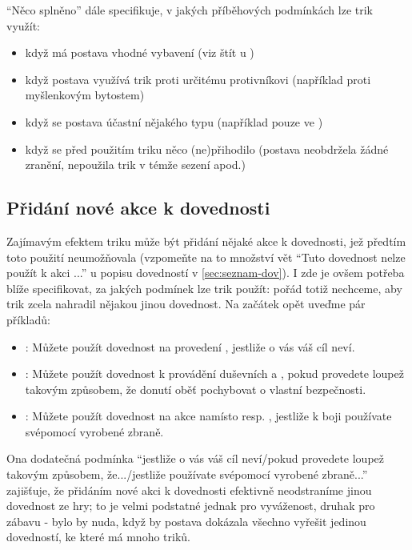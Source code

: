 \documentclass[../main.tex]{subfiles}
\begin{document}
``Něco splněno'' dále specifikuje, v jakých příběhových podmínkách lze trik využít:

\begin{itemize}
\item když má postava vhodné vybavení (viz štít u )
\item když postava využívá trik proti určitému protivníkovi (například proti myšlenkovým bytostem)
\item když se postava účastní nějakého typu  (například pouze ve )
\item když se před použitím triku něco (ne)přihodilo (postava neobdržela žádné zranění, nepoužila trik v témže sezení apod.)
\end{itemize}

\subsection{Přidání nové akce k dovednosti}
\label{sec:trik-pridani}

Zajímavým efektem triku může být přidání nějaké akce k dovednosti, jež předtím toto použití neumožňovala (vzpomeňte na to množství vět ``Tuto dovednost nelze použít k akci ...'' u popisu dovedností v \ref{sec:seznam-dov}). I zde je ovšem potřeba blíže specifikovat, za jakých podmínek lze trik použít: pořád totiž nechceme, aby trik zcela nahradil nějakou jinou dovednost.  Na začátek opět uveďme pár příkladů:

\begin{itemize}
\item {}:
  Můžete použít dovednost  na provedení , jestliže o vás váš cíl neví.
\item {}:
  Můžete použít dovednost  k provádění duševních  a , pokud provedete loupež takovým způsobem, že donutí oběť pochybovat o vlastní bezpečnosti.
\item {}:
  Můžete použít dovednost  na akce  namísto  resp. , jestliže k boji používate svépomocí vyrobené zbraně.
\end{itemize}

Ona dodatečná podmínka ``jestliže o vás váš cíl neví/pokud provedete loupež takovým způsobem, že.../jestliže používate svépomocí vyrobené zbraně...'' zajišťuje, že přidáním nové akci k dovednosti efektivně neodstraníme jinou dovednost ze hry; to je velmi podstatné jednak pro vyváženost, druhak pro zábavu - bylo by nuda, když by postava dokázala všechno vyřešit jedinou dovedností, ke které má mnoho triků.
\end{document}
